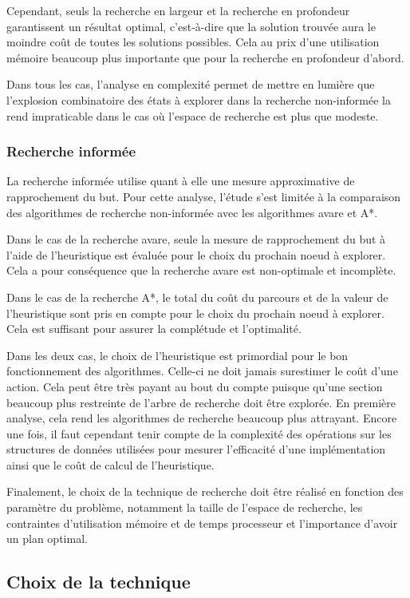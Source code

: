 \documentclass[12pt,english,frenchb,letterpaper]{article}
\begin{document}
Cependant, seuls la recherche en largeur et la recherche en profondeur garantissent un résultat optimal, c'est-à-dire que la solution trouvée aura le moindre coût de toutes les solutions possibles. Cela au prix d'une utilisation mémoire beaucoup plus importante que pour la recherche en profondeur d'abord.

Dans tous les cas, l'analyse en complexité permet de mettre en lumière que l'explosion combinatoire des états à explorer dans la recherche non-informée la rend impraticable dans le cas où l'espace de recherche est plus que modeste.  

\subsubsection{Recherche informée}
La recherche informée utilise quant à elle une mesure approximative de rapprochement du but. Pour cette analyse, l'étude s'est limitée à la comparaison des algorithmes de recherche non-informée avec les algorithmes avare et A*.

Dans le cas de la recherche avare, seule la mesure de rapprochement du but à l'aide de l'heuristique est évaluée pour le choix du prochain noeud à explorer.  Cela a pour conséquence que la recherche avare est non-optimale et incomplète.

Dans le cas de la recherche A*, le total du coût du parcours et de la valeur de l'heuristique sont pris en compte pour le choix du prochain noeud à explorer.  Cela est suffisant pour assurer la complétude et l'optimalité.

Dans les deux cas, le choix de l'heuristique est primordial pour le bon fonctionnement des algorithmes.  Celle-ci ne doit jamais surestimer le coût d'une action.  Cela peut être très payant au bout du compte puisque qu'une section beaucoup plus restreinte de l'arbre de recherche doit être explorée.  En première analyse, cela rend les algorithmes de recherche beaucoup plus attrayant.  Encore une fois, il faut cependant tenir compte de la complexité des opérations sur les structures de données utilisées pour mesurer l'efficacité d'une implémentation ainsi que le coût de calcul de l'heuristique.  

Finalement, le choix de la technique de recherche doit être réalisé en fonction des paramètre du problème, notamment la taille de l'espace de recherche, les contraintes d'utilisation mémoire et de temps processeur et l'importance d'avoir un plan optimal. 


\subsection{Choix de la technique}
\end{document}
